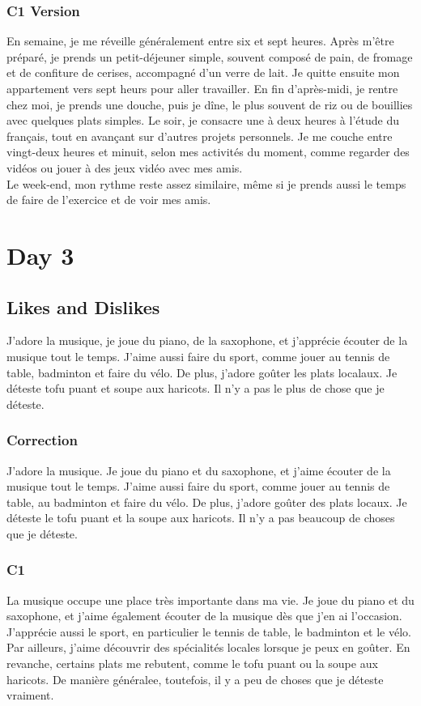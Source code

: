 \documentclass{book}
\begin{document}
    \subsection*{C1 Version}
        En semaine, je me réveille généralement entre six et sept heures. 
        Après m'être préparé, je prends un petit-déjeuner simple, souvent composé de pain, de fromage et de confiture de cerises, accompagné d'un verre de lait.
        Je quitte ensuite mon appartement vers sept heurs pour aller travailler. 
        En fin d'après-midi, je rentre chez moi, je prends une douche, puis je dîne, le plus souvent de riz ou de bouillies avec quelques plats simples.
        Le soir, je consacre une à deux heures à l'étude du français, tout en avançant sur d'autres projets personnels.
        Je me couche entre vingt-deux heures et minuit, selon mes activités du moment, comme regarder des vidéos ou jouer à des jeux vidéo avec mes amis.
        \\
        Le week-end, mon rythme reste assez similaire, même si je prends aussi le temps de faire de l'exercice et de voir mes amis.

\chapter{Day 3}
    \section{Likes and Dislikes}
        J'adore la musique, je joue du piano, de la saxophone, et j'apprécie écouter de la musique tout le temps.
        J'aime aussi faire du sport, comme jouer au tennis de table, badminton et faire du vélo.
        De plus, j'adore goûter les plats localaux. Je déteste tofu puant et soupe aux haricots.
        Il n'y a pas le plus de chose que je déteste.

    \subsection*{Correction}
        J'adore la musique. Je joue du piano et du saxophone, et j'aime écouter de la musique tout le temps.
        J'aime aussi faire du sport, comme jouer au tennis de table, au badminton et faire du vélo.
        De plus, j'adore goûter des plats locaux. 
        Je déteste le tofu puant et la soupe aux haricots. 
        Il n'y a pas beaucoup de choses que je déteste.

    \subsection*{C1}
        La musique occupe une place très importante dans ma vie. 
        Je joue du piano et du saxophone, et j'aime également écouter de la musique dès que j'en ai l'occasion.
        J'apprécie aussi le sport, en particulier le tennis de table, le badminton et le vélo.
        Par ailleurs, j'aime découvrir des spécialités locales lorsque je peux en goûter. 
        En revanche, certains plats me rebutent, comme le tofu puant ou la soupe aux haricots. 
        De manière généralee, toutefois, il y a peu de choses que je déteste vraiment.
\end{document}
